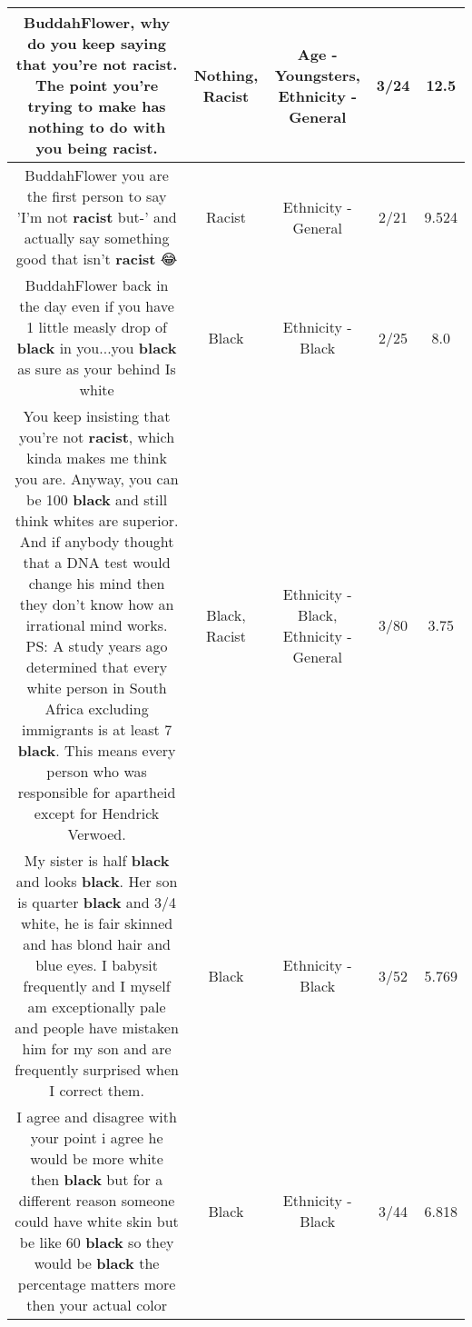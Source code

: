 \documentclass[11pt]{article}
\newlength\mylength
\begin{document}
\begin{center}
\begin{longtable}{|C{.65\mylength}|C{.30\mylength}|C{.12\mylength}|C{.12\mylength}|C{.12\mylength}|}
  \small BuddahFlower, why do you keep saying that you're not \textbf{racist}. The point you're trying to make has \textbf{nothing} to do with you being \textbf{racist}.\normalsize   & Nothing, Racist & Age - Youngsters, Ethnicity - General & 3/24 & 12.5 \\  \hline
  \small BuddahFlower you are the first person to say 'I'm not \textbf{racist} but-' and actually say something good that isn't \textbf{racist} 😂\normalsize   & Racist & Ethnicity - General & 2/21 & 9.524 \\  \hline
  \small BuddahFlower back in the day even if you have 1 little measly drop of \textbf{black} in you...you \textbf{black} as sure as your behind Is white\normalsize   & Black & Ethnicity - Black & 2/25 & 8.0 \\  \hline
  \small You keep insisting that you're not \textbf{racist}, which kinda makes me think you are. Anyway, you can be 100 \textbf{black} and still think whites are superior. And if anybody thought that a DNA test would change his mind then they don't know how an irrational mind works. PS: A study years ago determined that every white person in South Africa excluding immigrants is at least 7 \textbf{black}. This means every person who was responsible for apartheid except for Hendrick Verwoed.\normalsize   & Black, Racist & Ethnicity - Black, Ethnicity - General & 3/80 & 3.75 \\  \hline
  \small My sister is half \textbf{black} and looks \textbf{black}. Her son is quarter \textbf{black} and 3/4 white, he is fair skinned and has blond hair and blue eyes. I babysit frequently and I myself am exceptionally pale and people have mistaken him for my son and are frequently surprised when I correct them.\normalsize   & Black & Ethnicity - Black & 3/52 & 5.769 \\  \hline
  \small I agree and disagree with your point i agree he would be more white then \textbf{black} but for a different reason someone could have white skin but be like 60 \textbf{black} so they would be \textbf{black} the percentage matters more then your actual color\normalsize   & Black & Ethnicity - Black & 3/44 & 6.818 \\  \hline

\end{longtable}
\end{center}
\end{document}
